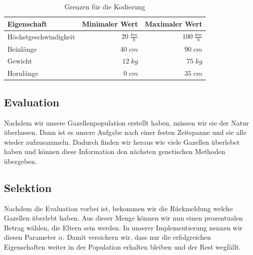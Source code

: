             \begin{table}[H]
                \begin{center}
                \begin{tabular}{ |l|r|r| } 
                    \hline
                    Eigenschaft              & Minimaler Wert        & Maximaler Wert       \\ \hline
                    Höchstgeschwindigkeit    & $ 20\; \frac{km}{h}$  & $ 100\; \frac{km}{h}$ \\ \hline
                    Beinlänge                & $ 40\; cm          $  & $ 90\; cm          $ \\ \hline
                    Gewicht                  & $ 12\; kg          $  & $ 75\; kg          $ \\ \hline
                    Hornlänge                & $  0\; cm          $  & $ 35\; cm          $ \\ \hline
                \end{tabular}
                \end{center}
                \caption{Grenzen für die Kodierung \cite{wiki:gazelle} \cite{blog:gazelle}\label{fig:gazelle-bounds}}
            \end{table}
            \noindent

        \subsection{Evaluation}
            Nachdem wir unsere Gazellenpopulation erstellt haben, müssen wir sie der Natur überlassen. Dann ist es unsere Aufgabe nach einer festen Zeitspanne und sie alle wieder aufzusammeln. Dadurch finden wir heraus wie viele Gazellen überlebet haben und können diese Information den nächsten genetischen Methoden übergeben.

        \subsection{Selektion}

            Nachdem die Evaluation vorbei ist, bekommen wir die Rückmeldung welche Gazellen überlebt haben. Aus dieser Menge können wir nun einen prozentualen Betrag wählen, die Eltern sein werden. In unserer Implementierung nennen wir diesen Parameter $\alpha$. Damit versichern wir, dass nur die erfolgreichen Eigenschaften weiter in der Population erhalten bleiben und der Rest wegfällt.

